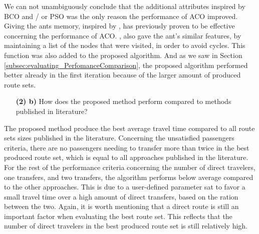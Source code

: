 We can not unambiguously conclude that the additional attributes inspired by BCO and / or PSO was the only reason the performance of ACO improved. Giving the ants memory, inspired by \citet{dorigo96}, has previously proven to be effective concerning the performance of ACO. \citet{sedighpour14}, \citet{poorzahedy11} \citet{salehinejad10} also gave the ant's similar features, by maintaining a list of the nodes that were visited, in order to avoid cycles. This function was also added to the proposed algorithm. And as we saw in Section \vref{subsec:evaluating_PerfomanceComparison}, the proposed algorithm performed better already in the first iteration because of the larger amount of produced route sets.

\begin{itemize}
\item[\textbf{(2) b)}] How does the proposed method perform compared to methods published in literature?
\end{itemize}

The proposed method produce the best average travel time compared to all route sets sizes published in the literature. Concerning the unsatisfied passengers criteria, there are no passengers needing to transfer more than twice in the best produced route set, which is equal to all approaches published in the literature. For the rest of the performance criteria concerning the number of direct travelers, one transfers, and two transfers, the algorithm performs below average compared to the other approaches. This is due to a user-defined parameter sat to favor a small travel time over a high amount of direct transfers, based on the ration between the two. Again, it is worth mentioning that a direct route is still an important factor when evaluating the best route set. This reflects that the number of direct travelers in the best produced route set is still relatively high.

